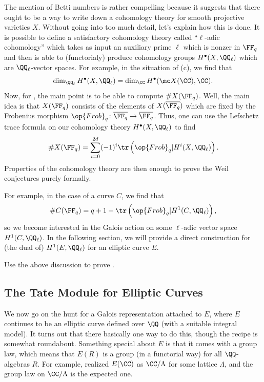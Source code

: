 \documentclass{article}
\begin{document}
The mention of Betti numbers is rather compelling because it suggests that there ought to be a way to write down a cohomology theory for smooth projective varieties $X$. Without going into too much detail, let's explain how this is done. It is possible to define a satisfactory cohomology theory called ``$\ell$-adic cohomology'' which takes as input an auxiliary prime $\ell$ which is nonzer in $\FF_q$ and then is able to (functorialy) produce cohomology groups $H^\bullet(X,\QQ_\ell)$ which are $\QQ_\ell$-vector spaces. For example, in the situation of (c), we find that
\[\dim_{\QQ_\ell} H^\bullet(X,\QQ_{\ell})=\dim_\CC H^\bullet(\mc X(\CC),\CC).\]
Now, for , the main point is to be able to compute $\#X(\FF_q)$. Well, the main idea is that $X(\FF_q)$ consists of the elements of $X(\overline{\FF_q})$ which are fixed by the Frobenius morphism $\op{Frob}_q\colon\overline{\FF_q}\to\overline{\FF_q}$. Thus, one can use the Lefschetz trace formula on our cohomology theory $H^\bullet(X,\QQ_\ell)$ to find
\[\#X(\FF_q)=\sum_{i=0}^{2d}(-1)^i\tr\left({\op{Frob}_q}\vert H^i(X,\QQ_\ell)\right).\]
Properties of the cohomology theory are then enough to prove the Weil conjectures purely formally.

For example, in the case of a curve $C$, we find that
\[\#C(\FF_q)=q+1-\tr\left({\op{Frob}_q}\vert H^1(C,\QQ_\ell)\right),\]
so we become interested in the Galois action on some $\ell$-adic vector space $H^1(C,\QQ_\ell)$. In the following section, we will provide a direct construction for (the dual of) $H^1(E,\QQ_\ell)$ for an elliptic curve $E$.
\begin{exe}
	Use the above discussion to prove .
\end{exe}

\subsection{The Tate Module for Elliptic Curves} \label{subsec:tate-module-ecs}
We now go on the hunt for a Galois representation attached to $E$, where $E$ continues to be an elliptic curve defined over $\QQ$ (with a suitable integral model). It turns out that there basically one way to do this, though the recipe is somewhat roundabout. Something special about $E$ is that it comes with a group law, which means that $E(R)$ is a group (in a functorial way) for all $\QQ$-algebras $R$. For example,  realized $E(\CC)$ as $\CC/\Lambda$ for some lattice $\Lambda$, and the group law on $\CC/\Lambda$ is the expected one.
\end{document}
